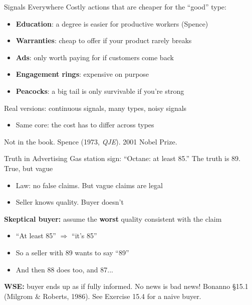 \begin{frame}{Signals Everywhere}
Costly actions that are cheaper for the ``good'' type:
\begin{itemize}
    \item \textbf{Education}: a degree is easier for productive workers (Spence)
    \item \textbf{Warranties}: cheap to offer if your product rarely breaks
    \item \textbf{Ads}: only worth paying for if customers come back
    \item \textbf{Engagement rings}: expensive on purpose
    \item \textbf{Peacocks}: a big tail is only survivable if you're strong
\end{itemize}
\bsk
Real versions: continuous signals, many types, noisy signals
\begin{itemize}
    \item Same core: the cost has to differ across types
\end{itemize}
\vfill
{\footnotesize Not in the book. Spence (1973, \textit{QJE}). 2001 Nobel Prize.}
\vspace{-0.2in}
\end{frame}

\begin{frame}{Truth in Advertising}
Gas station sign: ``Octane: at least 85.'' The truth is 89. True, but vague
\begin{itemize}
    \item Law: no false claims. But vague claims are legal
    \item Seller knows quality. Buyer doesn't
\end{itemize}
\bsk
\textbf{Skeptical buyer:} assume the \textbf{worst} quality consistent with the claim
\begin{itemize}
    \item ``At least 85'' $\Rightarrow$ ``it's 85''
    \item So a seller with 89 wants to say ``89''
    \item And then 88 does too, and 87...
\end{itemize}
\bsk
\textbf{WSE:} buyer ends up as if fully informed. No news is bad news!
\vfill
{\footnotesize Bonanno \S15.1 (Milgrom \& Roberts, 1986). See Exercise 15.4 for a naive buyer.}
\vspace{-0.2in}
\end{frame}


